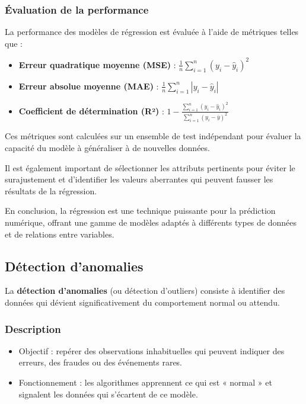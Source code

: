 \documentclass[a4paper,12pt]{report}
\begin{document}
\subsubsection*{Évaluation de la performance}

La performance des modèles de régression est évaluée à l’aide de métriques telles que :

\begin{itemize}
    \item \textbf{Erreur quadratique moyenne (MSE)} : \(\frac{1}{n} \sum_{i=1}^n (y_i - \hat{y}_i)^2\)
    \item \textbf{Erreur absolue moyenne (MAE)} : \(\frac{1}{n} \sum_{i=1}^n |y_i - \hat{y}_i|\)
    \item \textbf{Coefficient de détermination (R²)} : \(1 - \frac{\sum_{i=1}^n (y_i - \hat{y}_i)^2}{\sum_{i=1}^n (y_i - \bar{y})^2}\)
\end{itemize}

Ces métriques sont calculées sur un ensemble de test indépendant pour évaluer la capacité du modèle à généraliser à de nouvelles données.

Il est également important de sélectionner les attributs pertinents pour éviter le surajustement et d’identifier les valeurs aberrantes qui peuvent fausser les résultats de la régression.

En conclusion, la régression est une technique puissante pour la prédiction numérique, offrant une gamme de modèles adaptés à différents types de données et de relations entre variables.  
        \subsection{Détection d’anomalies}
        
        La \textbf{détection d’anomalies} (ou détection d’outliers) consiste à identifier des données qui dévient significativement du comportement normal ou attendu.
        
        \subsubsection*{Description}
        
        \begin{itemize}
            \item  Objectif : repérer des observations inhabituelles qui peuvent indiquer des erreurs, des fraudes ou des événements rares.
            \item  Fonctionnement : les algorithmes apprennent ce qui est « normal » et signalent les données qui s’écartent de ce modèle.
        \end{itemize}
        
\end{document}
